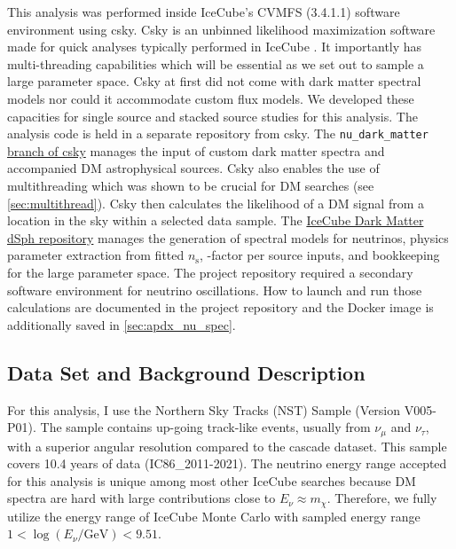 This analysis was performed inside IceCube's CVMFS (3.4.1.1) software environment using csky.
Csky is an unbinned likelihood maximization software made for quick analyses typically performed in IceCube \cite{csky}.
It importantly has multi-threading capabilities which will be essential as we set out to sample a large parameter space.
Csky at first did not come with dark matter spectral models nor could it accommodate custom flux models.
We developed these capacities for single source and stacked source studies for this analysis.
The analysis code is held in a separate repository from csky.
The \texttt{nu\_dark\_matter} \href{https://github.com/icecube/csky/tree/nu\_dark\_matter}{branch of csky} manages the input of custom dark matter spectra and accompanied DM astrophysical sources.
Csky also enables the use of multithreading which was shown to be crucial for DM searches (see \cref{sec:multithread}).
Csky then calculates the likelihood of a DM signal from a location in the sky within a selected data sample.
The \href{https://github.com/salaza82/IceCube_dark_matter_dsph}{IceCube Dark Matter dSph repository} manages the generation of spectral models for neutrinos, physics parameter extraction from fitted $n_{\mathrm{s}}$, \J-factor per source inputs, and bookkeeping for the large parameter space.
The project repository required a secondary software environment for neutrino oscillations.
How to launch and run those calculations are documented in the project repository and the Docker image is additionally saved in \cref{sec:apdx_nu_spec}.

\subsection{Data Set and Background Description} \label{sec:icDM_data_bkgd}

For this analysis, I use the Northern Sky Tracks (NST) Sample (Version V005-P01).
The sample contains up-going track-like events, usually from $\nu_\mu$ and $\nu_\tau$, with a superior angular resolution compared to the cascade dataset.
This sample covers 10.4 years of data (IC86\_2011-2021).
The neutrino energy range accepted for this analysis is unique among most other IceCube searches because DM spectra are hard with large contributions close to $E_\nu \approx m_\chi$.
Therefore, we fully utilize the energy range of IceCube Monte Carlo with sampled energy range $1 < \log(E_\nu /\textrm{GeV}) < 9.51$.

